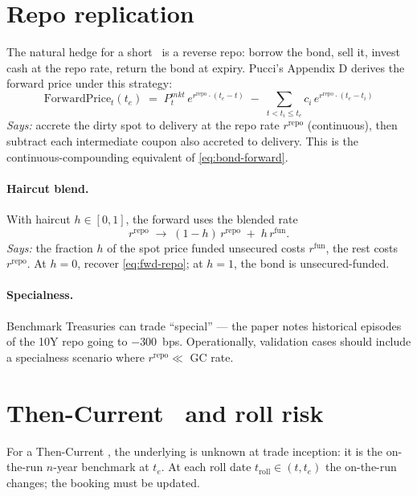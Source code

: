 \documentclass[11pt,a4paper]{article}
\newcommand{\Tlock}{\text{T-Lock}}
\newcommand{\FwdP}{\mathrm{ForwardPrice}}
\newcommand{\rrepo}{r^{\mathrm{repo}}}
\newcommand{\rfun}{r^{\mathrm{fun}}}
\begin{document}
\section{Repo replication}\label{sec:repo}

The natural hedge for a short \Tlock\ is a reverse repo: borrow the
bond, sell it, invest cash at the repo rate, return the bond at
expiry. Pucci's Appendix D derives the forward price under this
strategy:
\begin{equation}\label{eq:fwd-repo}
\boxed{\;
\FwdP_t(t_e) \;=\; P^{mkt}_t \, e^{\rrepo \cdot (t_e - t)}
                \;-\; \sum_{t < t_i \le t_e} c_i \, e^{\rrepo \cdot (t_e - t_i)}\;
}
\end{equation}
\textit{Says:} accrete the dirty spot to delivery at the repo rate
$\rrepo$ (continuous), then subtract each intermediate coupon also
accreted to delivery. This is the continuous-compounding equivalent
of \eqref{eq:bond-forward}.

\paragraph{Haircut blend.} With haircut $h \in [0,1]$, the forward
uses the blended rate
\begin{equation}\label{eq:fwd-haircut}
  \rrepo \;\longrightarrow\; (1 - h)\, \rrepo \;+\; h\, \rfun.
\end{equation}
\textit{Says:} the fraction $h$ of the spot price funded unsecured
costs $\rfun$, the rest costs $\rrepo$. At $h=0$, recover
\eqref{eq:fwd-repo}; at $h=1$, the bond is unsecured-funded.

\paragraph{Specialness.} Benchmark Treasuries can trade ``special''
--- the paper notes historical episodes of the 10Y repo going to
$-300$~bps. Operationally, validation cases should include a
specialness scenario where $\rrepo \ll$ GC rate.

\section{Then-Current \Tlock\ and roll risk}\label{sec:tcurrent}

For a Then-Current \Tlock, the underlying is unknown at trade
inception: it is the on-the-run $n$-year benchmark at $t_e$. At each
roll date $t_{\mathrm{roll}} \in (t, t_e)$ the on-the-run changes; the
booking must be updated.
\end{document}
